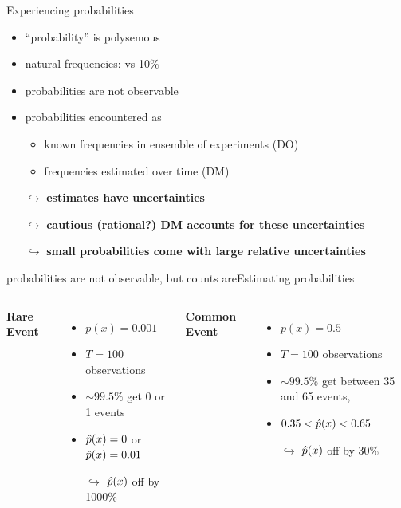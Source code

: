 \begin{frame}{Experiencing probabilities}

\begin{itemize}
 \item ``probability'' is polysemous
 \item natural frequencies:  vs 10\% 
  \item probabilities are not observable
  \item probabilities encountered as
  	\begin{itemize}
  		\item known frequencies in ensemble of experiments (DO)
  		\item frequencies estimated over time (DM)
  	\end{itemize}
  \item[$\hookrightarrow$] \textbf{estimates have uncertainties}
  \item[$\hookrightarrow$] \textbf{cautious (rational?) DM accounts for these uncertainties}
  \item[$\hookrightarrow$] \textbf{small probabilities come with large relative uncertainties}

\end{itemize}
\end{frame}


\begin{frame}{probabilities are not observable, but counts are}{Estimating probabilities}
\begin{columns}[T]
\textbf{Rare Event} %
\begin{itemize}
  \item $p(x) = 0.001$
  \item $T=\num{100}$ observations
  \item $\sim 99.5\%$ get 0 or 1 events
  \item $\hat{p}(x) = 0$ or $\hat{p}(x)=0.01$
  \item[$\hookrightarrow$] $\hat{p}(x)$ off by \num{1000}\% 
\end{itemize}
\textbf{Common Event} %
\begin{itemize}
  \item $p(x)=0.5$
  \item $T= \num{100}$ observations
  \item $\sim 99.5\%$ get between 35 and 65 events,
  \item $0.35< \hat{p}(x) <0.65$
  \item[$\hookrightarrow$] $\hat{p}(x)$ off by 30\%
\end{itemize}
\end{columns}
\vspace{2em}
 \centering
{}
\end{frame}


